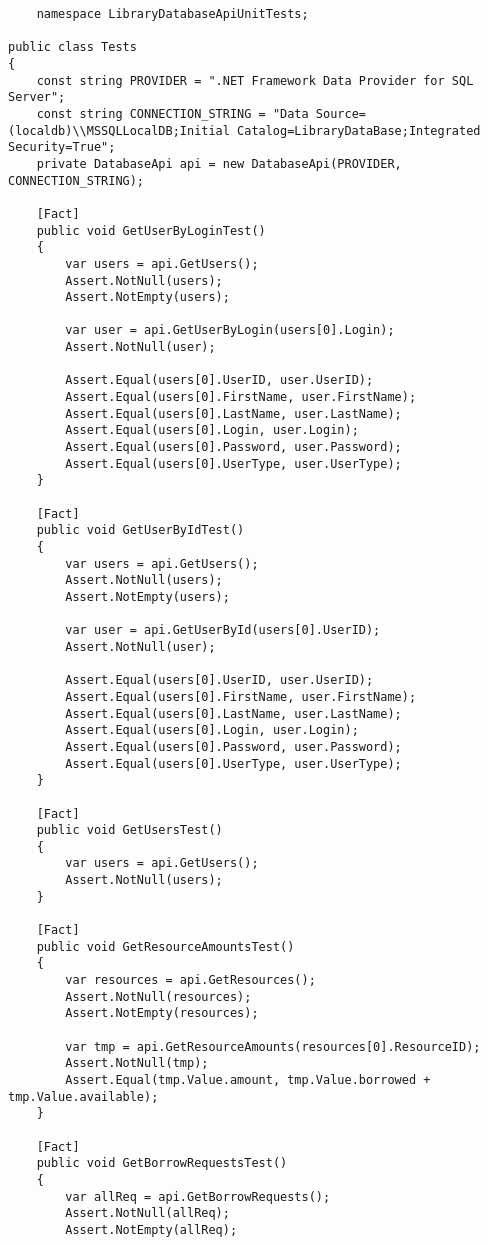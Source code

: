 \begin{verbatim}
    namespace LibraryDatabaseApiUnitTests;

public class Tests
{
    const string PROVIDER = ".NET Framework Data Provider for SQL Server";
    const string CONNECTION_STRING = "Data Source=(localdb)\\MSSQLLocalDB;Initial Catalog=LibraryDataBase;Integrated Security=True";
    private DatabaseApi api = new DatabaseApi(PROVIDER, CONNECTION_STRING);

    [Fact]
    public void GetUserByLoginTest()
    {
        var users = api.GetUsers();
        Assert.NotNull(users);
        Assert.NotEmpty(users);

        var user = api.GetUserByLogin(users[0].Login);
        Assert.NotNull(user);

        Assert.Equal(users[0].UserID, user.UserID);
        Assert.Equal(users[0].FirstName, user.FirstName);
        Assert.Equal(users[0].LastName, user.LastName);
        Assert.Equal(users[0].Login, user.Login);
        Assert.Equal(users[0].Password, user.Password);
        Assert.Equal(users[0].UserType, user.UserType);
    }

    [Fact]
    public void GetUserByIdTest()
    {
        var users = api.GetUsers();
        Assert.NotNull(users);
        Assert.NotEmpty(users);

        var user = api.GetUserById(users[0].UserID);
        Assert.NotNull(user);

        Assert.Equal(users[0].UserID, user.UserID);
        Assert.Equal(users[0].FirstName, user.FirstName);
        Assert.Equal(users[0].LastName, user.LastName);
        Assert.Equal(users[0].Login, user.Login);
        Assert.Equal(users[0].Password, user.Password);
        Assert.Equal(users[0].UserType, user.UserType);
    }

    [Fact]
    public void GetUsersTest()
    {
        var users = api.GetUsers();
        Assert.NotNull(users);
    }

    [Fact]
    public void GetResourceAmountsTest()
    {
        var resources = api.GetResources();
        Assert.NotNull(resources);
        Assert.NotEmpty(resources);

        var tmp = api.GetResourceAmounts(resources[0].ResourceID);
        Assert.NotNull(tmp);
        Assert.Equal(tmp.Value.amount, tmp.Value.borrowed + tmp.Value.available);
    }

    [Fact]
    public void GetBorrowRequestsTest()
    {
        var allReq = api.GetBorrowRequests();
        Assert.NotNull(allReq);
        Assert.NotEmpty(allReq);


\end{verbatim}
